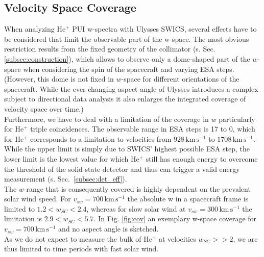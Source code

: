\subsection{Velocity Space Coverage}
\label{subsec:cov}
When analyzing $\mathrm{He^{+}}$ PUI w-spectra with Ulysses SWICS, several effects have to be considered that limit the observable part of the w-space. The most obvious restriction results from the fixed geometry of the collimator (s. Sec. \ref{subsec:construction}), which allows to observe only a dome-shaped part of the $w$-space when considering the spin of the spacecraft and varying ESA steps.\\ (However, this dome is not fixed in $w$-space for different orientations of the spacecraft. While the ever changing aspect angle of Ulysses introduces a complex subject to directional data analysis it also enlarges the integrated coverage of velocity space over time.)\\
Furthermore, we have to deal with a limitation of the coverage in $w$ particularly for $\mathrm{He^{+}}$ triple coincidences. The observable range in ESA steps is 17 to 0, which for $\mathrm{He^{+}}$ corresponds to a limitation to velocities from $928\,\mathrm{km\,s^{-1}}$ to $1708\,\mathrm{km\,s^{-1}}$. While the upper limit is simply due to SWICS' highest possible ESA step, the lower limit is the lowest value for which $\mathrm{He^{+}}$ still has enough energy to overcome the threshold of the solid-state detector and thus can trigger a valid energy measurement (s. Sec.~\ref{subsec:det_eff}).\\
The $w$-range that is consequently covered is highly dependent on the prevalent solar wind speed. For $v_{sw} = 700 \,\mathrm{km\,s^{-1}}$ the absolute w in a spacecraft frame is limited to $1.2 < w_{SC} < 2.4$, whereas for slow solar wind at $v_{sw} = 300 \,\mathrm{km\,s^{-1}}$ the limitation is $2.9 < w_{SC} < 5.7$. 
In Fig. \ref{fig:cov} an exemplary w-space coverage for $v_{sw} = 700 \,\mathrm{km\,s^{-1}}$ and no aspect angle is sketched.\\
As we do not expect to measure the bulk of $\mathrm{He^{+}}$ at velocities $w_{SC}>>2$, we are thus limited to time periods with fast solar wind.
